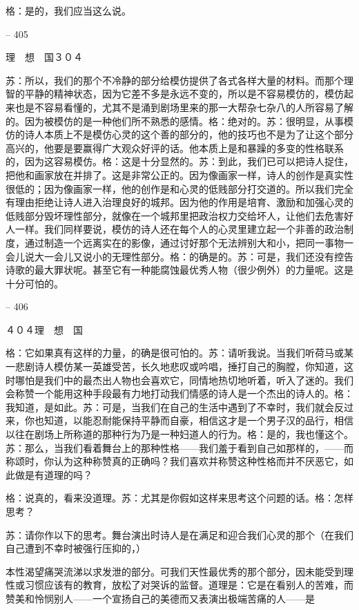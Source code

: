 \documentclass[11pt,oneside]{book}
\begin{document}
\begin{common-format}
    格：是的，我们应当这么说。

    

-- 405

    理　想　国３０４

    苏：所以，我们的那个不冷静的部分给模仿提供了各式各样大量的材料。而那个理智的平静的精神状态，因为它差不多是永远不变的，所以是不容易模仿的，模仿起来也是不容易看懂的，尤其不是涌到剧场里来的那一大帮杂七杂八的人所容易了解的。因为被模仿的是一种他们所不熟悉的感情。格：绝对的。苏：很明显，从事模仿的诗人本质上不是模仿心灵的这个善的部分的，他的技巧也不是为了让这个部分高兴的，他要是要赢得广大观众好评的话。他本质上是和暴躁的多变的性格联系的，因为这容易模仿。格：这是十分显然的。苏：到此，我们已可以把诗人捉住，把他和画家放在并排了。这是非常公正的。因为像画家一样，诗人的创作是真实性很低的；因为像画家一样，他的创作是和心灵的低贱部分打交道的。所以我们完全有理由拒绝让诗人进入治理良好的城邦。因为他的作用是培育、激励和加强心灵的低贱部分毁坏理性部分，就像在一个城邦里把政治权力交给坏人，让他们去危害好人一样。我们同样要说，模仿的诗人还在每个人的心灵里建立起一个非善的政治制度，通过制造一个远离实在的影像，通过讨好那个无法辨别大和小，把同一事物一会儿说大一会儿又说小的无理性部分。格：的确是的。苏：可是，我们还没有控告诗歌的最大罪状呢。甚至它有一种能腐蚀最优秀人物（很少例外）的力量呢。这是十分可怕的。

    

-- 406

    ４０４理　想　国

    格：它如果真有这样的力量，的确是很可怕的。苏：请听我说。当我们听荷马或某一悲剧诗人模仿某一英雄受苦，长久地悲叹或吟唱，捶打自己的胸膛，你知道，这时哪怕是我们中的最杰出人物也会喜欢它，同情地热切地听着，听入了迷的。我们会称赞一个能用这种手段最有力地打动我们情感的诗人是一个杰出的诗人的。格：我知道，是如此。苏：可是，当我们在自己的生活中遇到了不幸时，我们就会反过来，你也知道，以能忍耐能保持平静而自豪，相信这才是一个男子汉的品行，相信以往在剧场上所称道的那种行为乃是一种妇道人的行为。格：是的，我也懂这个。苏：那么，当我们看着舞台上的那种性格——我们羞于看到自己如那样的，——而称颂时，你认为这种称赞真的正确吗？我们喜欢并称赞这种性格而并不厌恶它，如此做是有道理的吗？

    格：说真的，看来没道理。苏：尤其是你假如这样来思考这个问题的话。格：怎样思考？

    苏：请你作以下的思考。舞台演出时诗人是在满足和迎合我们心灵的那个（在我们自己遭到不幸时被强行压抑的，）

    本性渴望痛哭流涕以求发泄的部分。可我们天性最优秀的那个部分，因未能受到理性或习惯应该有的教育，放松了对哭诉的监督。道理是：它是在看别人的苦难，而赞美和怜悯别人——一个宣扬自己的美德而又表演出极端苦痛的人——是


\end{common-format}
\end{document}
